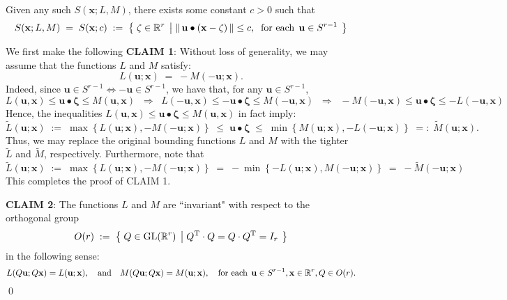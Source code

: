 \begin{proposition}\quad
Given any such $S(\mathbf{x};L,M)$, there exists some constant $c > 0$ such that
\begin{equation*}
S(\mathbf{x};L,M) \; = \; S(\mathbf{x};c) \; := \;
\left\{\;
\zeta \in \Re^{r}
\;\left\vert\;
\Vert\,\mathbf{u} \bullet (\mathbf{x} - \mathbf{\zeta})\,\Vert
\leq c,
\;\;
\textnormal{for each}\;\, \mathbf{u} \in S^{r-1}
\right.
\;\right\}
\end{equation*}
\end{proposition}
\proof
We first make the following
\vskip 0.5cm
\noindent
\textbf{CLAIM 1}: Without loss of generality, we may assume that the functions $L$ and $M$ satisfy:
\begin{equation*}
L(\mathbf{u};\mathbf{x}) \; = \; -M(-\mathbf{u};\mathbf{x}).
\end{equation*}
Indeed, since $\mathbf{u} \in S^{r-1} \Longleftrightarrow -\mathbf{u} \in S^{r-1}$, we have that,
for any $\mathbf{u} \in S^{r-1}$,
\begin{equation*}
L(\mathbf{u},\mathbf{x}) \leq \mathbf{u} \bullet \mathbf{\zeta} \leq M(\mathbf{u},\mathbf{x})
\;\;\Longrightarrow\;\;
L(-\mathbf{u},\mathbf{x}) \leq -\mathbf{u} \bullet \mathbf{\zeta} \leq M(-\mathbf{u},\mathbf{x})
\;\;\Longrightarrow\;\;
-M(-\mathbf{u},\mathbf{x}) \leq \mathbf{u} \bullet \mathbf{\zeta} \leq -L(-\mathbf{u},\mathbf{x})
\end{equation*}
Hence, the inequalities
$L(\mathbf{u},\mathbf{x}) \leq \mathbf{u} \bullet \mathbf{\zeta} \leq M(\mathbf{u},\mathbf{x})$
in fact imply:
\begin{equation*}
\widetilde{L}(\mathbf{u};\mathbf{x}) \; := \;\max\left\{L(\mathbf{u};\mathbf{x}),-M(-\mathbf{u};\mathbf{x})\right\}
\; \leq \; \mathbf{u} \bullet \mathbf{\zeta} \; \leq \;
\min\left\{M(\mathbf{u};\mathbf{x}),-L(-\mathbf{u};\mathbf{x})\right\} \; =: \; \widetilde{M}(\mathbf{u};\mathbf{x}).
\end{equation*}
Thus, we may replace the original bounding functions $L$ and $M$ with the tighter
$\widetilde{L}$ and $\widetilde{M}$, respectively.  Furthermore, note that
\begin{equation*}
\widetilde{L}(\mathbf{u};\mathbf{x})
\; := \;
\max\left\{ L(\mathbf{u};\mathbf{x}),-M(-\mathbf{u};\mathbf{x}) \right\}
\;  = \;
- \min\left\{ -L(\mathbf{u};\mathbf{x}),M(-\mathbf{u};\mathbf{x}) \right\}
\;  = \;
- \widetilde{M}(-\mathbf{u};\mathbf{x})
\end{equation*}
This completes the proof of CLAIM 1.

\vskip 0.5cm
\noindent
\textbf{CLAIM 2}: The functions $L$ and $M$ are ``invariant" with respect to the orthogonal group
\begin{equation*}
O(r) \; := \;
\left\{\;
Q \in \textnormal{GL}(\Re^{r})
\;\left\vert\;
Q^{\textnormal{T}} \cdot Q = Q \cdot Q^{\textnormal{T}} = I_{r}
\right.
\;\right\}
\end{equation*}
in the following sense:
\begin{equation*}
L(Q\mathbf{u};Q\mathbf{x}) = L(\mathbf{u};\mathbf{x}),
\quad\textnormal{and}\quad
M(Q\mathbf{u};Q\mathbf{x}) = M(\mathbf{u};\mathbf{x}),
\quad
\textnormal{for each}\;\, \mathbf{u} \in S^{r-1}, \mathbf{x} \in \Re^{r}, Q \in O(r).
\end{equation*}
\qed
